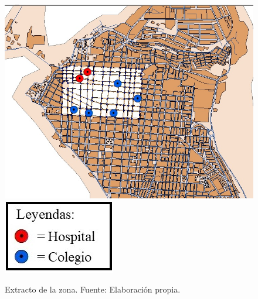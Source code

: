 \documentclass[letterpaper,conference]{IEEEtran}
\begin{document}
\begin{figure}[h!]
	\centering
	\includegraphics[scale=0.44]{Figuras/mapa2.jpg} 
	\includegraphics[scale=0.5]{Figuras/simb1.jpg}
	\caption{Extracto de la zona. Fuente: Elaboración propia.}
	\label{fig:fig4}
\end{figure}
\end{document}
